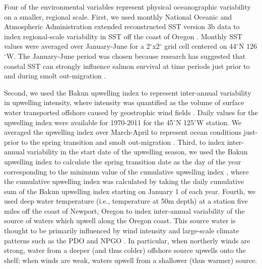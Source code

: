 Four of the environmental variables represent physical oceanographic variability
on a smaller, regional scale. First, we used monthly National Oceanic and
Atmospheric Administration extended reconstructed SST version 3b data to index
regional-scale variability in SST off the coast of Oregon \citep{Smith2008a}.
Monthly SST values were averaged over January-June for a 2$^{\circ}$x2$^{\circ}$ grid cell
centered on 44$^{\circ}$N 126$^{\circ}$W. The January-June period was chosen because research has
suggested that coastal SST can strongly influence salmon survival at time
periods just prior to and during smolt out-migration \citep{Mueter2005a}.

Second, we used the Bakun upwelling index to represent inter-annual variability
in upwelling intensity, where intensity was quantified as the volume of surface
water transported offshore caused by geostrophic wind fields \citep{Bakun1973,
Schwing1996}. Daily values for the upwelling index were available for 1970-2011
for the 45$^{\circ}$N 125$^{\circ}$W station.  We averaged the upwelling index over March-April to
represent ocean conditions just-prior to the spring transition and smolt
out-migration \citep{Logerwell2003a, Lawson1997}. Third, to index inter-annual
variability in the start date of the upwelling season, we used the Bakun
upwelling index to calculate the spring transition date as the day of the year
corresponding to the minimum value of the cumulative upwelling index
\citep{Bakun1973, Bograd2009}, where the cumulative upwelling index was
calculated by taking the daily cumulative sum of the Bakun upwelling index
starting on January 1 of each year. Fourth, we used deep water temperature
(i.e., temperature at 50m depth) at a station five miles off the coast of
Newport, Oregon to index inter-annual variability of the source of waters which
upwell along the Oregon coast. This source water is thought to be primarily
influenced by wind intensity and large-scale climate patterns such as the PDO
and NPGO \citep{Jacox2014, Chhak2007}. In particular, when northerly winds are
strong, water from a deeper (and thus colder) offshore source upwells onto the
shelf; when winds are weak, waters upwell from a shallower (thus warmer) source.


